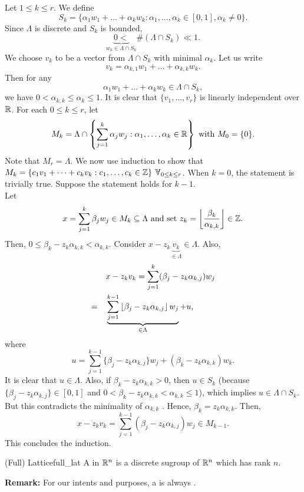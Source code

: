\documentclass{Vorlesungstemplate_English} %
\begin{document}
 \begin{pf}
   Let $1 \leq k \leq r$. We define
   \[ S_k = \{ \alpha_1w_1 + \dots + \alpha_kw_k: \alpha_1, \dots, \alpha_k \in [0,1], \alpha_k \neq 0\}.\]
   Since $\Lambda$ is discrete and $S_k$ is bounded,
   \[ \underbrace{0 <}_{w_k \in \Lambda \cap S_k} \#(\Lambda \cap S_k) \ll 1.\]
   We choose $v_k$ to be a vector from $\Lambda \cap S_k$ with minimal $\alpha_k$. Let us write
   \[ v_k = \alpha_{k,1}w_1 + \dots + \alpha_{k,k}w_k.\]
   Then for any
    \[ \alpha_1w_1 + \dots + \alpha_kw_k \in \Lambda \cap S_k,\]
    we have $0 < \alpha_{k,k} \leq \alpha_k \leq 1$. It is clear that $\{ v_1, \dots, v_r\}$ is linearly independent over $\mathbb{R}$. For each $0 \leq k \leq r$, let
    \[ M_k = \Lambda \cap \left\{ \sum_{j=1}^k \alpha_jw_j: \alpha_1, \dots, \alpha_k \in \mathbb{R}\right\} \text{ with } M_0 = \{ 0\}.\]
    Note that $M_r = \Lambda$. We now use induction to show that $M_k = \{ c_1v_1 + \dots + c_kv_k: c_1, \dots, c_k \in \Z\} \forall_{0 \leq k \leq r}$. When $k = 0$, the statement is trivially true. Suppose the statement holds for $k-1$. \\
    Let
    \[ x = \sum_{j=1}^k \beta_jw_j \in M_k \subseteq \Lambda \text{ and set } z_k = \left\lfloor \frac{\beta_k}{\alpha_{k,k}}\right\rfloor \in \mathbb{Z}.\]
    Then, $0 \leq \beta_k - z_k\alpha_{k,k} < \alpha_{k,k}$. Consider $x - z_k\underbrace{v_k}_{\in \Lambda} \in \Lambda$. Also, \begin{align*}
    & x-z_kv_k = \sum_{j=1}^k (\beta_j-z_k\alpha_{k,j})w_j \\
    = \quad & \underbrace{\sum_{j=1}^{k-1} \left\lfloor \beta_j-z_k\alpha_{k,j}\right\rfloor w_j}_{\in \Lambda} + u,\end{align*}
    where
    \[ u = \sum_{j=1}^{k-1} \{\beta_j-z_k\alpha_{k,j}\}w_j+(\beta_k-z_k\alpha_{k,k})w_k.\]
    It is clear that $u \in \Lambda$. Also, if $\beta_k-z_k\alpha_{k,k} > 0$, then $u \in S_k$ (because $\{ \beta_j-z_k\alpha_{k,j}\} \in [0,1]$ and $0 < \beta_k-z_k\alpha_{k,k} < \alpha_{k,k} \leq 1$), which implies $u \in \Lambda \cap S_k$. But this contradicts the minimality of $\alpha_{k,k}$ \Lightning. Hence, $\beta_k = z_k\alpha_{k,k}$. Then,
    \[ x-z_kv_k = \sum_{j=1}^{k-1} (\beta_j-z_k\alpha_{k,j})w_j \in M_{k-1}.\]
    This concludes the induction.
 \end{pf}
 \begin{definition}{(Full) Lattice}{full_lat}
   A  in $\mathbb{R}^n$ is a discrete sugroup of $\mathbb{R}^n$ which has rank $n$.
 \end{definition}
 \noindent \textbf{Remark:} For our intents and purposes, a  is always .
\end{document}
